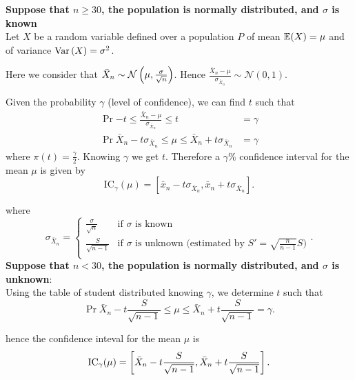 \documentclass{report}
\begin{document}
\begin{enumerate}

	\ii \textbf{Suppose that $n\geq30$, the population is normally distributed, and $\sigma$ is known}\\
	Let $X$ be a random variable defined over a population $P$ of mean $\mathbb{E}(X)=\mu$ and of variance $\mathrm{Var}\left( X \right)=\sigma^2$.

	Here we consider that $\bar{X}_n\sim\mathcal{N}\left(\mu,\frac{\sigma}{\sqrt{n}}\right)$. Hence $\frac{\bar{X}_n-\mu}{\sigma_{\bar{X}_n}}\sim\mathcal{N}(0,1)$.

	Given the probability $\gamma$ (level of confidence), we can find $t$ such that
	\begin{align*}
		\Pr{-t\leq\frac{\bar{X}_n-\mu}{\sigma_{\bar{X}_n}}\leq t}                   & =\gamma \\
		\Pr{\bar{X}_n-t\sigma_{\bar{X}_n}\leq\mu\leq \bar{X}_n+t\sigma_{\bar{X}_n}} & =\gamma
	\end{align*}
	where $\pi(t)=\frac{\gamma}{2}$. Knowing $\gamma$ we get $t$. Therefore a $\gamma\%$ confidence interval for the mean $\mu$ is given by
	\[
		\mathrm{IC}_\gamma(\mu)=[\bar{x}_n-t\sigma_{\bar{X}_n},\bar{x}_n+t\sigma_{\bar{X}_n}]
		.\]

	where
	\[
		\sigma_{\bar{X}_n} = \begin{cases}
			\frac{\sigma}{\sqrt{n}} & \text{if }\sigma\text{ is known}                                           \\
			\frac{S}{\sqrt{n-1}}    & \text{if }\sigma\text{ is unknown (estimated by }S'=\sqrt{\frac{n}{n-1}}S) \\
		\end{cases}
		.\]
	\ii \textbf{Suppose that $n<30$, the population is normally distributed, and $\sigma$ is unknown}:\\

	Using the table of student distributed knowing $\gamma$, we determine $t$ such that
	\[
		\Pr{\bar{X}_n-t\frac{S}{\sqrt{n-1}}\leq \mu\leq \bar{X}_n+t\frac{S}{\sqrt{n-1}}} = \gamma
		.\]

	hence the confidence inteval for the mean $\mu$ is
	\[
		\mathrm{IC}_\gamma(\mu) = \left[\bar{X}_n-t\frac{S}{\sqrt{n-1}},\bar{X}_n+t\frac{S}{\sqrt{n-1}}\right]
		.\]



\end{enumerate}
\end{document}
